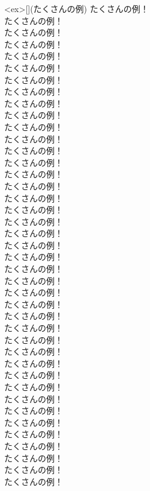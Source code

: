 \documentclass[11pt, a4paper]{ltjsarticle}
\begin{document}
\begin{statementsp}<ex>[](たくさんの例)
    たくさんの例！\\ 
    たくさんの例！\\ 
    たくさんの例！\\ 
    たくさんの例！\\ 
    たくさんの例！\\ 
    たくさんの例！\\ 
    たくさんの例！\\ 
    たくさんの例！\\ 
    たくさんの例！\\ 
    たくさんの例！\\ 
    たくさんの例！\\ 
    たくさんの例！\\ 
    たくさんの例！\\ 
    たくさんの例！\\ 
    たくさんの例！\\ 
    たくさんの例！\\ 
    たくさんの例！\\ 
    たくさんの例！\\ 
    たくさんの例！\\ 
    たくさんの例！\\ 
    たくさんの例！\\ 
    たくさんの例！\\ 
    たくさんの例！\\ 
    たくさんの例！\\ 
    たくさんの例！\\ 
    たくさんの例！\\ 
    たくさんの例！\\ 
    たくさんの例！\\ 
    たくさんの例！\\ 
    たくさんの例！\\ 
    たくさんの例！\\ 
    たくさんの例！\\ 
    たくさんの例！\\ 
    たくさんの例！\\ 
    たくさんの例！\\ 
    たくさんの例！\\ 
    たくさんの例！\\ 
    たくさんの例！\\ 
    たくさんの例！\\ 
    たくさんの例！\\ 
    たくさんの例！\\ 

\end{statementsp}
\end{document}
